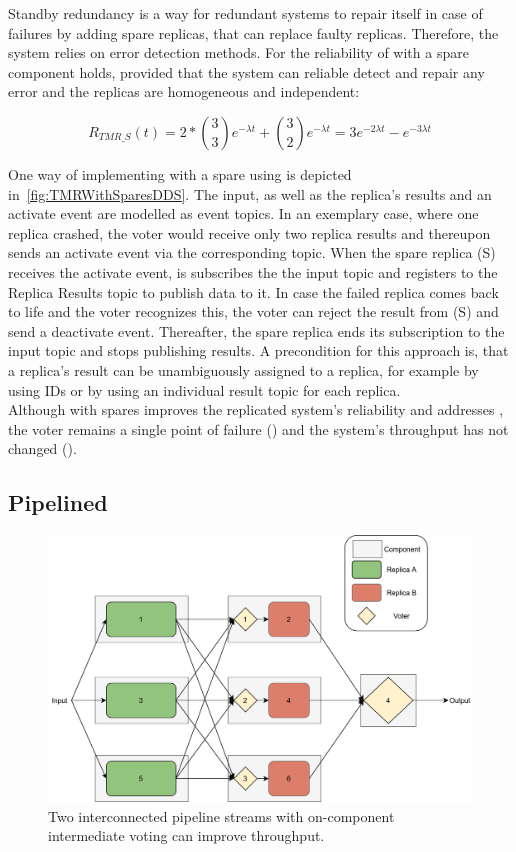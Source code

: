 Standby redundancy is a way for redundant systems to repair itself in case of failures by adding spare replicas, that can replace faulty replicas.
Therefore, the system relies on error detection methods.
For the reliability of  with a spare component holds, provided that the system can reliable detect and repair any error and the replicas are homogeneous and independent:

\begin{equation}
R_{TMR\_S}(t) = 2 * {3 \choose 3} e^{-\lambda t} + {3 \choose 2} e^{-\lambda t}
 = 3e^{-2 \lambda t} - e^{-3 \lambda t}
\end{equation}

One way of implementing  with a spare using  is depicted in~\autoref{fig:TMRWithSparesDDS}.
The input, as well as the replica's results and an activate event are modelled as  event topics.
In an exemplary case, where one replica crashed, the voter would receive only two replica results and thereupon sends an activate event via the corresponding topic.
When the spare replica (S) receives the activate event, is subscribes the the input topic and registers to the Replica Results topic to publish data to it.
In case the failed replica comes back to life and the voter recognizes this, the voter can reject the result from (S) and send a deactivate event.
Thereafter, the spare replica ends its subscription to the input topic and stops publishing results.
A precondition for this approach is, that a replica's result can be unambiguously assigned to a replica, for example by using IDs or by using an individual result topic for each replica. 
\\

Although  with spares improves the replicated system's reliability and addresses \ChallengeWR, the voter remains a single point of failure (\ChallengeVoter) and the system's throughput has not changed (\ChallengeThrough).

\subsection{Pipelined }
\begin{figure}[!hb]
	\centering
	\includegraphics[width=0.75\linewidth]{images/InterconnectedVoterPipeline}
	\caption{Two interconnected pipeline streams with on-component intermediate voting can improve throughput.}
	\label{fig:PipelineIntermediateVoters}
\end{figure}

